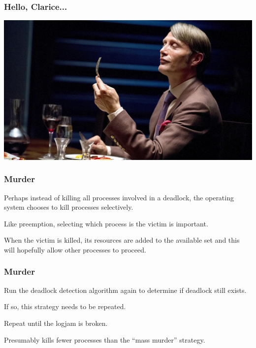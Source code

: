 \begin{frame}
\frametitle{Hello, Clarice...}

\begin{center}
	\includegraphics[width=\textwidth]{images/mikkelsen.jpg}
\end{center}

\end{frame}


\begin{frame}
\frametitle{Murder}

Perhaps instead of killing all processes involved in a deadlock, the operating system chooses to kill processes selectively. 

Like preemption, selecting which process is the victim is important. 

When the victim is killed, its resources are added to the available set and this will hopefully allow other processes to proceed. 

\end{frame}

\begin{frame}
\frametitle{Murder}
Run the deadlock detection algorithm again to determine if deadlock still exists. 

If so, this strategy needs to be repeated.

Repeat until the logjam is broken.

Presumably kills fewer processes than the ``mass murder'' strategy.

\end{frame}


